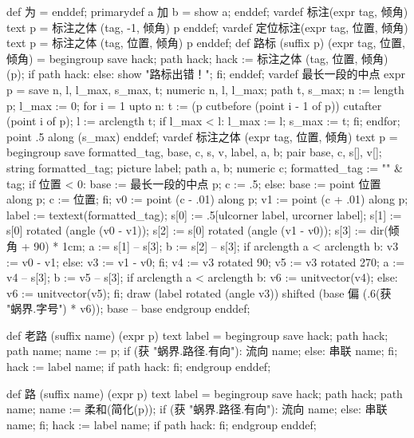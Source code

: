 \startMPinclusions[+]
def 为 = enddef;
primarydef a 加 b = 
  show a;
enddef;
vardef 标注(expr tag, 倾角) text p =
  标注之体 (tag, -1, 倾角) p
enddef;
vardef 定位标注(expr tag, 位置, 倾角) text p =
  标注之体 (tag, 位置, 倾角) p
enddef;
def 路标 (suffix p) (expr tag, 位置, 倾角) =
  begingroup
    save hack; path hack;
    hack := 标注之体 (tag, 位置, 倾角) (p);
    if path hack:
    else:
      show "路标出错！";
    fi;
enddef;
vardef 最长一段的中点 expr p =
  save n, l, l_max, s_max, t;
  numeric n, l, l_max; path t, s_max;
  n := length p;
  l_max := 0;
  for i = 1 upto n:
    t := (p cutbefore (point i - 1 of p)) cutafter (point i of p);
    l := arclength t;
    if l_max < l:
      l_max := l; s_max := t;
    fi;
  endfor;
  point .5 along (s_max)
enddef;
vardef 标注之体 (expr tag, 位置, 倾角) text p =
  begingroup
    save formatted_tag, base, c, s, v, label, a, b;
    pair base, c, s[], v[]; string formatted_tag; picture label; path a, b; numeric c;
    formatted_tag := "\tfx" & tag;
    if 位置 < 0:
      base := 最长一段的中点 p;
      c := .5;
    else:
      base := point 位置 along p;
      c := 位置;
    fi;
    v0 := point (c - .01) along p;
    v1 := point (c + .01) along p;
    label := textext(formatted_tag);
    s[0] := .5[ulcorner label, urcorner label];
    s[1] := s[0] rotated (angle (v0 - v1));
    s[2] := s[0] rotated (angle (v1 - v0));
    s[3] := dir(倾角 + 90) * 1cm; %
    a := s[1] -- s[3];
    b := s[2] -- s[3];
    if arclength a < arclength b:
      v3 := v0 - v1;
    else:
      v3 := v1 - v0;
    fi;
    v4 := v3 rotated 90;
    v5 := v3 rotated 270;
    a := v4 -- s[3];
    b := v5 -- s[3];
    if arclength a < arclength b:
      v6 := unitvector(v4);
    else:
      v6 := unitvector(v5);
    fi;
    draw (label rotated (angle v3)) shifted (base 偏 (.6(获 "蜗界.字号") * v6));
    base -- base
  endgroup
enddef;
\stopMPinclusions

\startMPinclusions[+]
def 老路 (suffix name) (expr p) text label =
  begingroup
  save hack; path hack;
  path name; name := p;
  if (获 "蜗界.路径.有向"):
    流向 name;
  else:
    串联 name;
  fi;
  hack := label name;
  if path hack: fi;
  endgroup
enddef;

def 路 (suffix name) (expr p) text label =
  begingroup
  save hack; path hack;
  path name; name := 柔和(简化(p));
  if (获 "蜗界.路径.有向"):
    流向 name;
  else:
    串联 name;
  fi;
  hack := label name; %
  if path hack: fi;
  endgroup
enddef;
\stopMPinclusions

